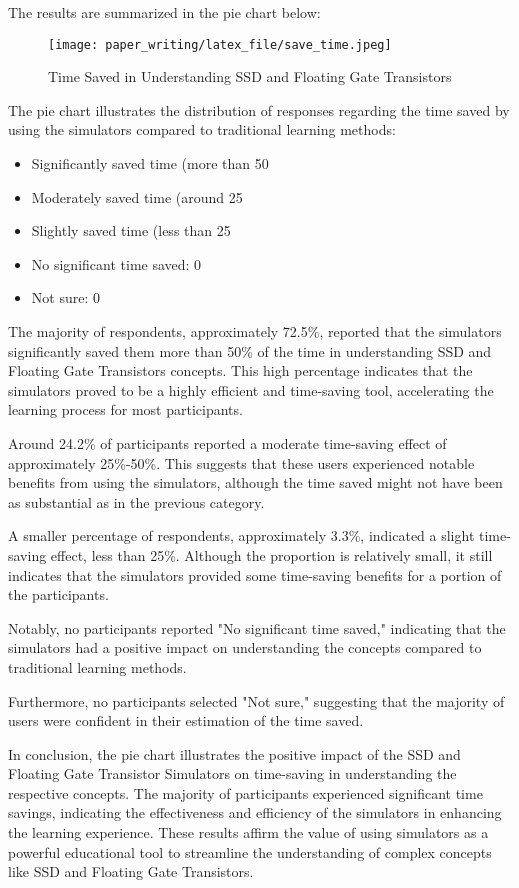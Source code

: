 \documentclass[conference]{/home/habib/Desktop/flash_ssd_simulator_web/paper_writing/latex_file/IEEEtran}
\begin{document}
The results are summarized in the pie chart below:
\begin{figure}[h]
    \centering
    \texttt{[image: paper\_writing/latex\_file/save\_time.jpeg]}
    \caption{Time Saved in Understanding SSD and Floating Gate Transistors}
    \label{fig:enter-label}
\end{figure}
The pie chart illustrates the distribution of responses regarding the time saved by using the simulators compared to traditional learning methods:
\begin{itemize}
    \item Significantly saved time (more than 50%
    \item Moderately saved time (around 25%
    \item Slightly saved time (less than 25%
    \item No significant time saved: 0%
    \item Not sure: 0%
\end{itemize}
The majority of respondents, approximately 72.5\%, reported that the simulators significantly saved them more than 50\% of the time in understanding SSD and Floating Gate Transistors concepts. This high percentage indicates that the simulators proved to be a highly efficient and time-saving tool, accelerating the learning process for most participants.

Around 24.2\% of participants reported a moderate time-saving effect of approximately 25\%-50\%. This suggests that these users experienced notable benefits from using the simulators, although the time saved might not have been as substantial as in the previous category.

A smaller percentage of respondents, approximately 3.3\%, indicated a slight time-saving effect, less than 25\%. Although the proportion is relatively small, it still indicates that the simulators provided some time-saving benefits for a portion of the participants.

Notably, no participants reported "No significant time saved," indicating that the simulators had a positive impact on understanding the concepts compared to traditional learning methods.

Furthermore, no participants selected "Not sure," suggesting that the majority of users were confident in their estimation of the time saved.

In conclusion, the pie chart illustrates the positive impact of the SSD and Floating Gate Transistor Simulators on time-saving in understanding the respective concepts. The majority of participants experienced significant time savings, indicating the effectiveness and efficiency of the simulators in enhancing the learning experience. These results affirm the value of using simulators as a powerful educational tool to streamline the understanding of complex concepts like SSD and Floating Gate Transistors.
\end{document}
